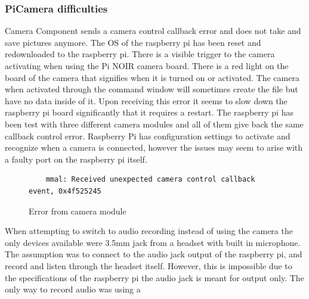 \subsubsection{PiCamera difficulties}
\par Camera Component sends a camera control callback error and does not take and save pictures anymore. The OS of the raspberry pi has been reset and redownloaded to the raspberry pi. There is a visible trigger to the camera activating when using the Pi NOIR camera board. There is a red light on the board of the camera that signifies when it is turned on or activated. The camera when activated through the command window will sometimes create the file but have no data inside of it. Upon receiving this error it seems to slow down the raspberry pi board significantly that it requires a restart. The raspberry pi has been test with three different camera modules and all of them give back the same callback control error.  Raspberry Pi has configuration settings to activate and recognize when a camera is connected, however the issues may seem to arise with a faulty port on the raspberry pi itself.
\begin{figure}[h]
	\begin{lstlisting}
	mmal: Received unexpected camera control callback event, 0x4f525245
	\end{lstlisting}
	\label{fig:camErr}
	\caption{Error from camera module}
\end{figure}
\par When attempting to switch to audio recording instead of using the camera the only devices available were 3.5mm jack from a headset with built in microphone. The assumption was to connect to the audio jack output of the raspberry pi, and record and listen through the headset itself. However, this is impossible due to the specifications of the raspberry pi the audio jack is meant for output only. The only way to record audio was using a 
